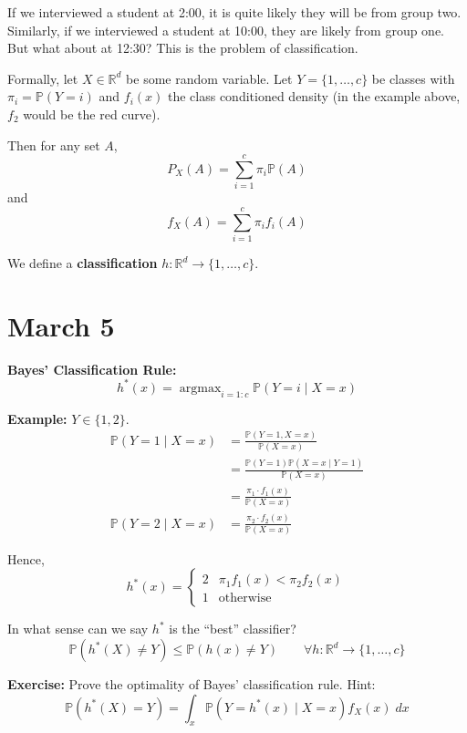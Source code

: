 \documentclass[12pt]{report}
\renewcommand{\P}{\mathbb{P}}
\newcommand{\R}{\mathbb{R}}
\newcommand*{\tbf}[1]{\ifmmode\mathbf{#1}\else\textbf{#1}\fi}
\DeclareMathOperator*{\argmax}{\arg\max}
\newenvironment*{exercise}[1][red]{
    \begin{tcolorbox}[
        parbox=false,
        colback=#1!5!white,
        colframe=#1!75!black,
        breakable
    ]}
    {\end{tcolorbox}}
\newenvironment*{proposition}[1][gray]{
\begin{tcolorbox}[
    parbox=false,
    colback=#1!5!white,
    colframe=#1!75!black,
    breakable
]}
{\end{tcolorbox}}
\begin{document}
If we interviewed a student at 2:00, it is quite likely they will be from group two. Similarly, if we interviewed a student at 10:00, they are likely from group one. But what about at 12:30? This is the problem of classification.

Formally, let $X \in \R^d$ be some random variable. Let $Y = \{1, \dots, c\}$ be classes with $\pi_i = \P(Y = i)$ and $f_i(x)$ the class conditioned density (in the example above, $f_2$ would be the red curve).

Then for any set $A$,
\[P_X(A) = \sum_{i=1}^{c} \pi_i \P(A)\]
and
\[f_X(A) = \sum_{i=1}^{c} \pi_i f_i(A)\]

We define a \tbf{classification} $h: \R^d \to \{1, \dots, c\}$.

\section{March 5}

\begin{proposition}
    \textbf{Bayes' Classification Rule:}
    \[h^*(x) = \argmax_{i =1:c} \P(Y = i \; | \; X = x) \]
\end{proposition}

\tbf{Example:} $Y \in \{1, 2\}$.
\begin{align*}
    \P(Y = 1\; | \; X = x) & = \frac{\P(Y= 1, X = x)}{\P(X = x)}               \\
                           & = \frac{\P(Y=1) \P(X = x \; | \; Y= 1)}{\P(X= x)} \\
                           & = \frac{\pi_1 \cdot f_1(x)}{\P(X = x)}            \\
    \P(Y = 2\; | \; X = x) & = \frac{\pi_2 \cdot f_2(x)}{\P(X = x)}
\end{align*}

Hence,
\[h^*(x) = \begin{cases}
        2 & \pi_1 f_1(x) < \pi_2 f_2(x) \\
        1 & \text{otherwise}
    \end{cases}\]

In what sense can we say $h^*$ is the ``best'' classifier?
\[\P(h^*(X) \neq Y) \leq \P(h(x) \neq Y) \qquad \forall h: \R^d \to \{1, \dots, c\}\]

\begin{exercise}
    \textbf{Exercise:} Prove the optimality of Bayes' classification rule. Hint:
    \[\P(h^*(X) = Y) = \int_x \P(Y = h^*(x) \; | \; X = x) f_X(x)\; dx\]
\end{exercise}
\end{document}

